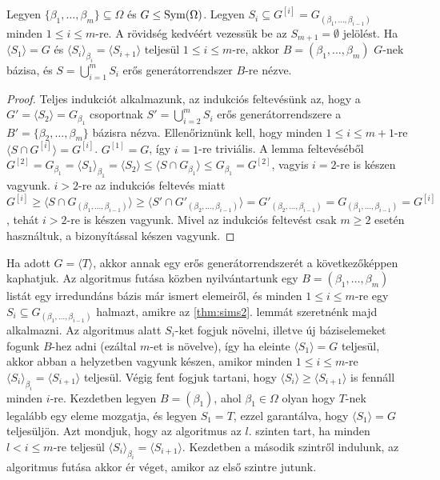 \begin{lemma}
\label{thm:sims2}
Legyen $\{\beta_1, \dots, \beta_m\} \subseteq \Omega$ és $G \le \operatorname{Sym}(\Omega)$.
Legyen $S_i \subseteq G^{[i]} = G_{(\beta_1, \dots, \beta_{i-1})}$ minden $1 \le i \le m$-re.
A rövidség kedvéért vezessük be az $S_{m+1} = \emptyset$ jelölést.
Ha $\langle S_1 \rangle = G$ és $\langle S_i \rangle_{\beta_i} = \langle S_{i+1} \rangle$ teljesül $1 \le i \le m$-re, akkor $B = (\beta_1, \dots, \beta_m)$
$G$-nek bázisa, és $S = \bigcup_{i=1}^m S_i$ erős generátorrendszer $B$-re nézve.
\end{lemma}
\begin{proof}
Teljes indukciót alkalmazunk, az indukciós feltevésünk az, hogy a $G' = \langle S_2 \rangle = G_{\beta_1}$ csoportnak $S' = \bigcup_{i=2}^m S_i$ erős generátorrendszere a $B' = \{\beta_2, \dots, \beta_m\}$ bázisra nézva.
Ellenőriznünk kell, hogy minden $1\le i \le m+1$-re $\langle S \cap G^{[i]} \rangle = G^{[i]}$.
$G^{[1]} = G$, így $i = 1$-re triviális.
A lemma feltevéséből $G^{[2]} = G_{\beta_1} = \langle S_1 \rangle_{\beta_1} = \langle S_2 \rangle \le \langle S \cap G_{\beta_1} \rangle \le G_{\beta_1} = G^{[2]}$, vagyis $i = 2$-re is készen vagyunk.
$i > 2$-re az indukciós feltevés miatt $G^{[i]} \ge \langle S \cap G_{(\beta_1, \dots, \beta_{i-1})} \rangle \ge \langle S' \cap G'_{(\beta_2, \dots, \beta_{i-1})} \rangle = G'_{(\beta_2, \dots, \beta_{i-1})} = G_{(\beta_1, \dots, \beta_{i-1})} = G^{[i]}$,
tehát $i > 2$-re is készen vagyunk.
Mivel az indukciós feltevést csak $m \ge 2$ esetén használtuk, a bizonyítással készen vagyunk.
\end{proof}
Ha adott $G = \langle T \rangle$, akkor annak egy erős generátorrendszerét a következőképpen kaphatjuk.
Az algoritmus futása közben nyilvántartunk egy $B = (\beta_1, \dots, \beta_m)$ listát egy irredundáns bázis már ismert elemeiről,
és minden $1 \le i \le m$-re egy $S_i \subseteq G_{(\beta_1, \dots, \beta_{i-1})}$ halmazt, amikre az \ref{thm:sims2}. lemmát szeretnénk majd alkalmazni.
Az algoritmus alatt $S_i$-ket fogjuk növelni, illetve új báziselemeket fogunk $B$-hez adni (ezáltal $m$-et is növelve), így ha eleinte $\langle S_1 \rangle = G$ teljesül,
akkor abban a helyzetben vagyunk készen, amikor minden $1 \le i \le m$-re $\langle S_i \rangle_{\beta_i} = \langle S_{i+1} \rangle$ teljesül.
Végig fent fogjuk tartani, hogy $\langle S_i \rangle \ge \langle S_{i+1} \rangle$ is fennáll minden $i$-re.
Kezdetben legyen $B = (\beta_1)$, ahol $\beta_1 \in \Omega$ olyan hogy $T$-nek legalább egy eleme mozgatja, és legyen $S_1 = T$, ezzel garantálva, hogy $\langle S_1 \rangle = G$ teljesüljön.
Azt mondjuk, hogy az algoritmus az $l$. szinten tart, ha minden $l < i \le m$-re teljesül $\langle S_i \rangle_{\beta_i} = \langle S_{i+1} \rangle$.
Kezdetben a második szintről indulunk, az algoritmus futása akkor ér véget, amikor az első szintre jutunk.

